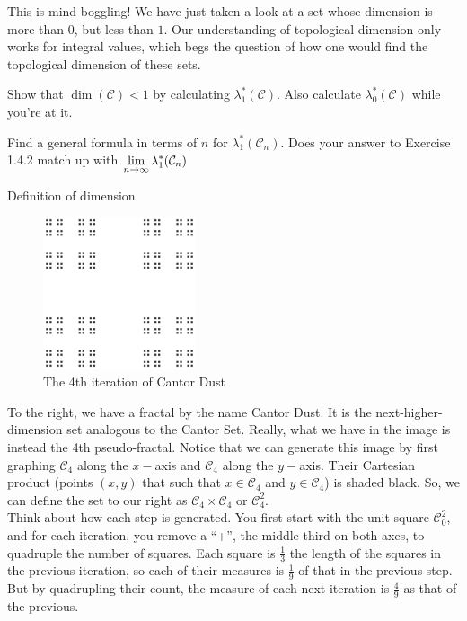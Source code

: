 This is mind boggling! We have just taken a look at a set whose dimension is more than $0$, but less than $1$. Our understanding of topological dimension only works for integral values, which begs the question of how one would find the topological dimension of these sets. 

\begin{exercise}
    Show that $\dim (\mathcal{C})<1$ by calculating $\lambda^*_1(\mathcal{C})$. Also calculate $\lambda^*_0(\mathcal{C})$ while you're at it.
\end{exercise}

\begin{exercise}
    Find a general formula in terms of $n$ for $\lambda^*_1(\mathcal{C}_{n})$. Does your answer to Exercise 1.4.2 match up with $\displaystyle\lim_{n\to\infty}\lambda^*_1(\mathcal{C}_{n})$
\end{exercise}

Definition of dimension

\begin{figure}
  \begin{center}
    \includegraphics[width=0.4\textwidth]{Images/1.4.4.png}
  \end{center}
  \caption{The 4th iteration of Cantor Dust}
\end{figure}

To the right, we have a fractal by the name Cantor Dust. It is the next-higher-dimension set analogous to the Cantor Set. Really, what we have in the image is instead the 4th pseudo-fractal. Notice that we can generate this image by first graphing $\mathcal{C}_4$ along the $x-$axis and $\mathcal{C}_4$ along the $y-$axis. Their Cartesian product (points $(x,y)$ that such that $x\in\mathcal{C}_4$ and $y\in\mathcal{C}_4$) is shaded black. So, we can define the set to our right as $\mathcal{C}_4\times \mathcal{C}_4$ or $\mathcal{C}^2_4$. \\

Think about how each step is generated. You first start with the unit square $\mathcal{C}^2_0$, and for each iteration, you remove a ``+'', the middle third on both axes, to quadruple the number of squares. Each square is $\frac{1}{3}$ the length of the squares in the previous iteration, so each of their measures is $\frac{1}{9}$ of that in the previous step. But by quadrupling their count, the measure of each next iteration is $\frac{4}{9}$ as that of the previous. 

